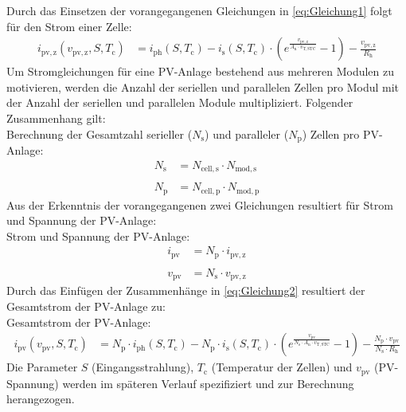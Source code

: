 \newline
Durch das Einsetzen der vorangegangenen Gleichungen in \autoref{eq:Gleichung1} folgt für den Strom einer Zelle:
\begin{align}
    i_{\mathrm{pv,z}}(v_{\mathrm{pv,z}}, S, T_{\mathrm{c}}) &= i_{\mathrm{ph}}(S, T_{\mathrm{c}})-i_{\mathrm{s}}(S, T_{\mathrm{c}})\cdot\left(e^{\frac{v_{\mathrm{pv,z}}}{A_{\mathrm{n}}\cdot v_{\mathrm{T,STC}}}}-1\right)-\frac{v_{\mathrm{pv,z}}}{R_{\mathrm{h}}}
    \label{eq:Gleichung2}
\end{align}
\newline
Um Stromgleichungen für eine PV-Anlage bestehend aus mehreren Modulen zu motivieren, werden die Anzahl der seriellen und parallelen Zellen pro Modul mit der Anzahl der seriellen und parallelen Module multipliziert. Folgender Zusammenhang gilt:\\
\newline
Berechnung der Gesamtzahl serieller ($N_{\mathrm{s}}$) und paralleler ($N_{\mathrm{p}}$) Zellen pro PV-Anlage:
\begin{align*}
    N_{\mathrm{s}} &= N_{\mathrm{cell,s}}\cdot N_{\mathrm{mod,s}} \\ \nonumber \\
    N_{\mathrm{p}} &= N_{\mathrm{cell,p}}\cdot N_{\mathrm{mod,p}}
\end{align*}
\newline
Aus der Erkenntnis der vorangegangenen zwei Gleichungen resultiert für Strom und Spannung der PV-Anlage:\\
\newline
Strom und Spannung der PV-Anlage:
\begin{align*}
    i_{\mathrm{pv}} &= N_{\mathrm{p}}\cdot i_{\mathrm{pv,z}} \\ \nonumber \\
    v_{\mathrm{pv}} &= N_{\mathrm{s}}\cdot v_{\mathrm{pv,z}}
\end{align*}
\newline
Durch das Einfügen der Zusammenhänge in \autoref{eq:Gleichung2} resultiert der Gesamtstrom der PV-Anlage zu:\\
\newline
Gesamtstrom der PV-Anlage:
\begin{align}
    i_{\mathrm{pv}}(v_{\mathrm{pv}}, S, T_{\mathrm{c}}) &= N_{\mathrm{p}}\cdot i_{\mathrm{ph}}(S, T_{\mathrm{c}})-N_{\mathrm{p}}\cdot i_{\mathrm{s}}(S, T_{\mathrm{c}})\cdot\left(e^{\frac{v_{\mathrm{pv}}}{N_{\mathrm{s}}\cdot A_{\mathrm{n}}\cdot v_{\mathrm{T,STC}}}}-1\right)-\frac{N_{\mathrm{p}}\cdot v_{\mathrm{pv}}}{N_{\mathrm{s}}\cdot R_{\mathrm{h}}}
    \label{eq:Gleichung3}
\end{align}
\newline
Die Parameter $S$ (Eingangsstrahlung), $T_{\mathrm{c}}$ (Temperatur der Zellen) und $v_{\mathrm{pv}}$ (PV-Spannung) werden im späteren Verlauf spezifiziert und zur Berechnung herangezogen.

